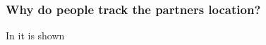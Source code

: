 \subsubsection{Why do people track the partners location?}
In \cite{Consolvo:2005:LDS:1054972.1054985} it is shown 





\label{subsec:D}

